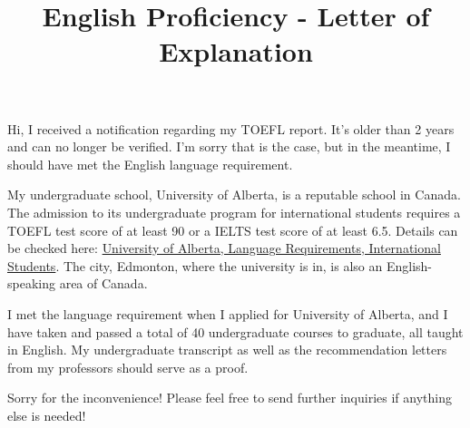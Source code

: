 \documentclass[11pt]{article}
\title{English Proficiency - Letter of Explanation}
\begin{document}
    \maketitle

    Hi, I received a notification regarding my TOEFL report.
    It's older than 2 years and can no longer be verified.
    I'm sorry that is the case,
    but in the meantime, I should have met the English language requirement.

    My undergraduate school, University of Alberta, is a reputable school in Canada.
    The admission to its undergraduate program for international students requires a TOEFL test score of at least 90 or a IELTS test score of at least 6.5.
    Details can be checked here: \href{https://www.ualberta.ca/admissions/international/admission/admission-requirements/language-requirements/index.html?}{University of Alberta, Language Requirements, International Students}.
    The city, Edmonton, where the university is in, is also an English-speaking area of Canada.

    I met the language requirement when I applied for University of Alberta,
    and I have taken and passed a total of 40 undergraduate courses to graduate, all taught in English.
    My undergraduate transcript as well as the recommendation letters from my professors should serve as a proof.

    Sorry for the inconvenience!
    Please feel free to send further inquiries if anything else is needed!
\end{document}
